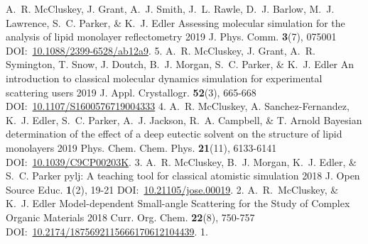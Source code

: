 \begin{cvpubys}
  \cvpuby
    {A.~R. McCluskey, J. Grant, A.~J. Smith, J.~L. Rawle, D.~J. Barlow, M.~J. Lawrence, S.~C. Parker, \& K.~J. Edler}
    {Assessing molecular simulation for the analysis of lipid monolayer reflectometry}
    {2019}
    {J. Phys. Comm.}
    {\textbf{3}(7), 075001}
    {DOI:~\href{https://doi.org/10.1088/2399-6528/ab12a9}{10.1088/2399-6528/ab12a9}.}
    {5.}
  \cvpuby
    {A.~R. McCluskey, J. Grant, A.~R. Symington, T. Snow, J. Doutch, B.~J. Morgan, S.~C. Parker, \& K.~J. Edler}
    {An introduction to classical molecular dynamics simulation for experimental scattering users}
    {2019}
    {J. Appl. Crystallogr.}
    {\textbf{52}(3), 665-668}
    {DOI:~\href{https://doi.org/10.1107/S1600576719004333}{10.1107/S1600576719004333}}
    {4.}
  \cvpuby
    {A.~R. McCluskey, A. Sanchez-Fernandez, K.~J. Edler, S.~C. Parker, A.~J. Jackson, R.~A. Campbell, \& T. Arnold}
    {Bayesian determination of the effect of a deep eutectic solvent on the structure of lipid monolayers}
    {2019}
    {Phys. Chem. Chem. Phys.}
    {\textbf{21}(11), 6133-6141}
    {DOI:~\href{https://doi.org/10.1039/C9CP00203K}{10.1039/C9CP00203K}.}
    {3.}
  \cvpuby
    {A.~R. McCluskey, B.~J. Morgan, K.~J. Edler, \& S.~C. Parker}
    {pylj: A teaching tool for classical atomistic simulation}
    {2018}
    {J. Open Source Educ.}
    {\textbf{1}(2), 19-21}
    {DOI:~\href{http://doi.org/10.21105/jose.00019}{10.21105/jose.00019}.}
    {2.}
  \cvpuby
    {A.~R.~McCluskey, \& K.~J. Edler}
    {Model-dependent Small-angle Scattering for the Study of Complex Organic Materials}
    {2018}
    {Curr. Org. Chem.}
    {\textbf{22}(8), 750-757}
    {DOI:~\href{http://doi.org/10.2174/1875692115666170612104439}{10.2174/1875692115666170612104439}.}
    {1.}
\end{cvpubys}
